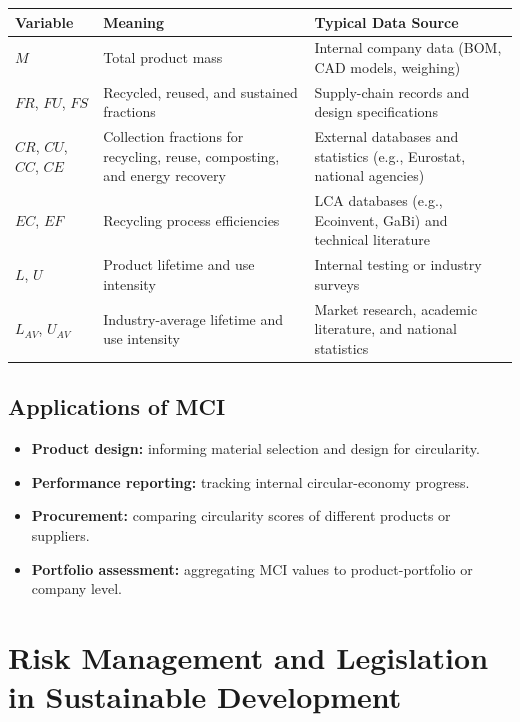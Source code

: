 \documentclass{NoteThesis/note-thesis}
\begin{document}
\begin{table}[h]
    \centering
    \begin{tabular}{p{2.5cm}p{5cm}p{5.5cm}}
        \hline
        Variable & Meaning & Typical Data Source \\
        \hline
        $M$ & Total product mass & Internal company data (BOM, CAD models, weighing) \\
        $FR$, $FU$, $FS$ & Recycled, reused, and sustained fractions & Supply-chain records and design specifications \\
        $CR$, $CU$, $CC$, $CE$ & Collection fractions for recycling, reuse, composting, and energy recovery & External databases and statistics (e.g., Eurostat, national agencies) \\
        $EC$, $EF$ & Recycling process efficiencies & LCA databases (e.g., Ecoinvent, GaBi) and technical literature \\
        $L$, $U$ & Product lifetime and use intensity & Internal testing or industry surveys \\
        $L_{AV}$, $U_{AV}$ & Industry-average lifetime and use intensity & Market research, academic literature, and national statistics \\
        \hline
    \end{tabular}
\end{table}

\subsection{Applications of MCI}

\begin{itemize}
    \item \textbf{Product design:} informing material selection and design for circularity.
    \item \textbf{Performance reporting:} tracking internal circular-economy progress.
    \item \textbf{Procurement:} comparing circularity scores of different products or suppliers.
    \item \textbf{Portfolio assessment:} aggregating MCI values to product-portfolio or company level.
\end{itemize}

\section{Risk Management and Legislation in Sustainable Development}
\end{document}
